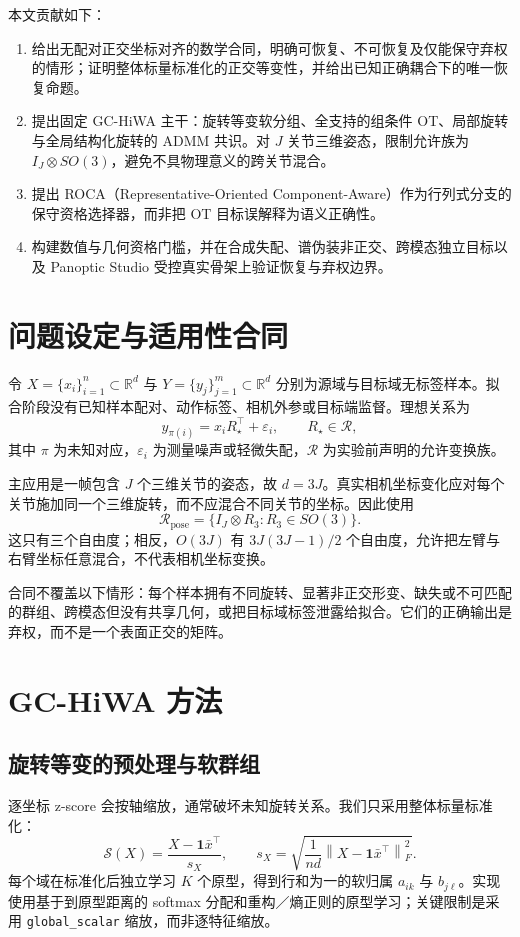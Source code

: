 \documentclass[UTF8,a4paper,11pt]{ctexart}
\newcommand{\RR}{\mathbb{R}}
\newcommand{\norm}[1]{\left\lVert #1\right\rVert}
\theoremstyle{definition}
\theoremstyle{remark}
\begin{document}
本文贡献如下：
\begin{enumerate}
  \item 给出无配对正交坐标对齐的数学合同，明确可恢复、不可恢复及仅能保守弃权的情形；证明整体标量标准化的正交等变性，并给出已知正确耦合下的唯一恢复命题。
  \item 提出固定 GC-HiWA 主干：旋转等变软分组、全支持的组条件 OT、局部旋转与全局结构化旋转的 ADMM 共识。对 $J$ 关节三维姿态，限制允许族为 $I_J\otimes SO(3)$，避免不具物理意义的跨关节混合。
  \item 提出 ROCA（Representative-Oriented Component-Aware）作为行列式分支的保守资格选择器，而非把 OT 目标误解释为语义正确性。
  \item 构建数值与几何资格门槛，并在合成失配、谱伪装非正交、跨模态独立目标以及 Panoptic Studio 受控真实骨架上验证恢复与弃权边界。
\end{enumerate}

\section{问题设定与适用性合同}\label{sec:contract}
令 $X=\{x_i\}_{i=1}^{n}\subset\RR^d$ 与 $Y=\{y_j\}_{j=1}^{m}\subset\RR^d$ 分别为源域与目标域无标签样本。拟合阶段没有已知样本配对、动作标签、相机外参或目标端监督。理想关系为
\begin{equation}\label{eq:ideal-model}
 y_{\pi(i)}=x_iR_\star^\top+\varepsilon_i,\qquad R_\star\in\mathcal R,
\end{equation}
其中 $\pi$ 为未知对应，$\varepsilon_i$ 为测量噪声或轻微失配，$\mathcal R$ 为实验前声明的允许变换族。

主应用是一帧包含 $J$ 个三维关节的姿态，故 $d=3J$。真实相机坐标变化应对每个关节施加同一个三维旋转，而不应混合不同关节的坐标。因此使用
\begin{equation}\label{eq:pose-family}
 \mathcal R_{\mathrm{pose}}=\{I_J\otimes R_3:R_3\in SO(3)\}.
\end{equation}
这只有三个自由度；相反，$O(3J)$ 有 $3J(3J-1)/2$ 个自由度，允许把左臂与右臂坐标任意混合，不代表相机坐标变换。

合同不覆盖以下情形：每个样本拥有不同旋转、显著非正交形变、缺失或不可匹配的群组、跨模态但没有共享几何，或把目标域标签泄露给拟合。它们的正确输出是弃权，而不是一个表面正交的矩阵。

\section{GC-HiWA 方法}\label{sec:method}
\subsection{旋转等变的预处理与软群组}
逐坐标 z-score 会按轴缩放，通常破坏未知旋转关系。我们只采用整体标量标准化：
\begin{equation}\label{eq:global-scale}
 \mathcal S(X)=\frac{X-\bm 1\bar x^\top}{s_X},\qquad
 s_X=\sqrt{\frac{1}{nd}\norm{X-\bm1\bar x^\top}_F^2}.
\end{equation}
每个域在标准化后独立学习 $K$ 个原型，得到行和为一的软归属 $a_{ik}$ 与 $b_{j\ell}$。实现使用基于到原型距离的 softmax 分配和重构／熵正则的原型学习；关键限制是采用 \texttt{global\_scalar} 缩放，而非逐特征缩放。
\end{document}
